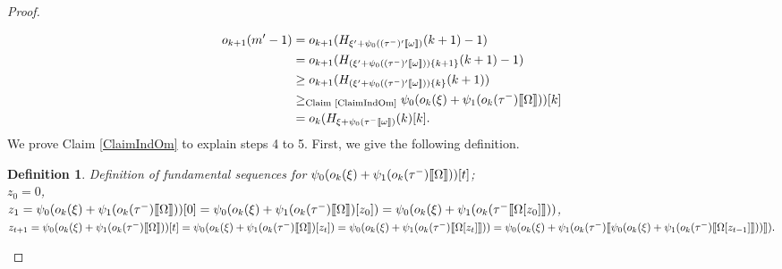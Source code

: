 \documentclass{amsart}
\theoremstyle{plain}
\theoremstyle{plain}
\newtheorem*{definition}{Definition}
\def\scbrl{[\hspace{-.14em}[}
\def\scbrr{]\hspace{-.14em}]}
\def\scbr#1{\scbrl#1\scbrr}
\newcommand{\Om}{{\Omega}}
\newcommand{\okpe}{o_{k+1}}
\newcommand{\ok}{o_{k}}
\newcommand{\om}{\omega}
\def\scbrl{[\hspace{-.14em}[}
\def\scbrr{]\hspace{-.14em}]}
\def\scbr#1{\scbrl#1\scbrr}
\begin{document}
\begin{proof}
\begin{Cases}
\begin{Cases}
\begin{Cases}
            \begin{align*} 
                \okpe(m'-1) & =\okpe(H_{\xi'+\psi_0((\tau^-)'\scbr{\om})}(k+1) -1)\\
                & = \okpe(H_{(\xi'+\psi_0((\tau^-)'\scbr{\om}))\{k+1\}}(k+1) -1)\\
                & \geq  \okpe(H_{(\xi'+\psi_0((\tau^-)'\scbr{\om}))\{k\}}(k+1))\\
                & \geq_{\text{Claim \ref{ClaimIndOm}}} \psi_0( \ok(\xi)+ \psi_1(\ok(\tau^-)\scbr{\Om})) [k]\\		
                &=\ok(H_{\xi+\psi_0(\tau^-\scbr{\om})}(k)[k].\\
            \end{align*}
            We prove Claim \ref{ClaimIndOm} to explain steps 4 to 5.
            First, we give the following definition.
            \begin{definition} Definition of fundamental sequences for 
                $\psi_0(\ok(\xi)+ \psi_1(\ok(\tau^-)\scbr{\Om}))[t]$;\\
                $z_0 =0$,\\
                $z_1 =	\psi_0( \ok(\xi)+ \psi_1(\ok(\tau^-)\scbr{\Om}))[0]                =\psi_0( \ok(\xi)+ \psi_1(\ok(\tau^-)\scbr{\Om})[z_0])
                =\psi_0( \ok(\xi) + \psi_1(\ok(\tau^-\scbr{\Om[z_0]}))$, 
                \\
                $z_{t+1} = \psi_0( \ok(\xi)+ \psi_1(\ok(\tau^-)\scbr{\Om}))[t]
                = \psi_0( \ok(\xi)+ \psi_1(\ok(\tau^-)\scbr{\Om})[z_t])\\
                =\psi_0( \ok(\xi)+ \psi_1(\ok(\tau^-)\scbr{\Om[z_t]}))
                = \psi_0( \ok(\xi)+\psi_1(\ok(\tau^-) \scbr{ \psi_0( \ok(\xi)+ \psi_1(\ok(\tau^-)\scbr{\Om[z_{t-1}]}) )}). $\medskip
            \end{definition}
            

\end{Cases}
\end{Cases}
\end{Cases}
\end{proof}
\end{document}
